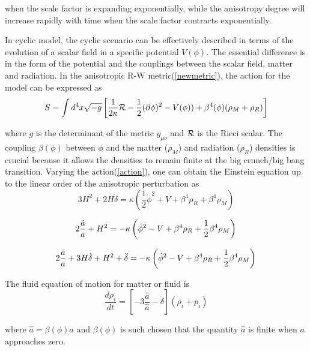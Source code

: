 \documentclass[a4paper,preprint]{revtex4}
\begin{document}
\noindent when the scale factor is expanding exponentially, while
the anisotropy degree will increase rapidly with time when the
scale factor contracts exponentially.

In cyclic model, the cyclic scenario can be effectively described
in terms of the evolution of a scalar field in a specific
potential $V(\phi)$. The essential difference is in the form of
the potential and the couplings between the scalar field, matter
and radiation\cite{steinhardt1}. In the anisotropic R-W
metric(\ref{newmetric}), the action for the model can be expressed
as
\begin{equation}\label{action}
S=\int d^4x\sqrt{-g}\left[\frac{1}{2\kappa}{\cal
R}-\frac{1}{2}(\partial\phi)^2-
V(\phi))+\beta^4(\phi)(\rho_M+\rho_R)\right]
\end{equation}

\noindent where $g$ is the determinant of the metric $g_{\mu \nu}$
and ${\cal R}$ is the Ricci scalar. The coupling $\beta(\phi)$
between $\phi$ and the matter ($\rho_M$) and radiation ($\rho_R$)
densities is crucial because it allows the densities to remain
finite at the big crunch/big bang transition. Varying the
action(\ref{action}), one can obtain the Einstein equation up to
the linear order of the anisotropic perturbation as
\begin{equation}\label{einstein11}
3H^2+2H\dot{\delta}=\kappa \left( \frac{1}{2} \dot{\phi}^2 +V +
\beta^4 \rho_R + \beta^4 \rho_M \right)
\end{equation}

\begin{equation}\label{einstein22}
 2\frac{\ddot{a}}{a}+H^2=- \kappa \left(\dot{\phi}^2 -V +
\beta^4 \rho_R +{1\over 2} \beta^4 \rho_M \right)
\end{equation}

\begin{equation}\label{einstein33}
  2\frac{\ddot{a}}{a}+3H\dot{\delta}+H^2+\ddot{\delta}=- \kappa \left(\dot{\phi}^2 -V +
\beta^4 \rho_R +{1\over 2} \beta^4 \rho_M \right)
\end{equation}

\noindent The fluid equation of motion for matter or fluid is
\begin{equation}\label{flueq}
\frac{d \rho_i}{d
t}=\left[-3\frac{\dot{\hat{a}}}{\hat{a}}-\dot{\delta}\right](\rho_i+p_i)
\end{equation}

\noindent where $\hat{a}=\beta(\phi) a$ and $\beta(\phi)$ is such
chosen that the quantity $\hat{a}$ is finite when $a$ approaches
zero.
\end{document}
